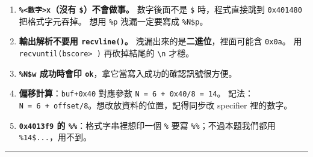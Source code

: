\documentclass[10pt,a4paper]{article}
\providecommand{\tightlist}{%
  \setlength{\itemsep}{0pt}\setlength{\parskip}{0pt}}
\begin{document}
\begin{enumerate}
  \begin{itemize}
  \tightlist
  \item
    \texttt{0x4060} 根本不在 \texttt{.\allowbreak{}bss}（\texttt{.\allowbreak{}bss} 是
    \texttt{0x404040}--\texttt{0x404070}），\texttt{0x404060} 是
    \textbf{stderr 的 COPY relocation 欄位}。
  \item
    這支程式\textbf{沒有匯入 \texttt{memcpy}}（\texttt{readelf\ \allowbreak{}-\allowbreak{}s} 只有
    write/strlen/strcspn/read/setvbuf）。
  \item
    \texttt{0x401540} 的 16 進位轉換只是把 18 bytes 寫進 printf
    自己堆疊框的暫存區，安全。 真正的原因在 §4.1 /
    §6：\texttt{overflow\_\allowbreak{}arg\_\allowbreak{}area} 初始化成 \texttt{buf}。
    \textbf{每個位址/機制都要自己用 \texttt{objdump}/\texttt{gdb}
    驗證，不要沿用別人的猜測。}
  \end{itemize}
\item
  \textbf{\texttt{\%\allowbreak{}\textless{}\allowbreak{}數字\textgreater{}\allowbreak{}x}（沒有
  \texttt{\$\allowbreak{}}）不會做事。} 數字後面不是 \texttt{\$\allowbreak{}} 時，程式直接跳到
  \texttt{0x401480} 把格式字元吞掉。 想用 \texttt{\%\allowbreak{}p} 洩漏一定要寫成
  \texttt{\%\allowbreak{}N\$\allowbreak{}p}。
\item
  \textbf{輸出解析不要用 \texttt{recvline()}。}
  洩漏出來的是\textbf{二進位}，裡面可能含 \texttt{0x0a}。 用
  \texttt{recvuntil(b\textquotesingle{}\allowbreak{}score\textgreater{}\allowbreak{}\ \allowbreak{}\textquotesingle{}\allowbreak{})}
  再砍掉結尾的 \texttt{\textbackslash{}\allowbreak{}n} 才穩。
\item
  \textbf{\texttt{\%\allowbreak{}N\$\allowbreak{}w} 成功時會印
  \texttt{ok}}，拿它當寫入成功的確認訊號很方便。
\item
  \textbf{偏移計算}：\texttt{buf+0x40} 對應參數
  \texttt{N\ \allowbreak{}=\ \allowbreak{}6\ \allowbreak{}+\ \allowbreak{}0x40/\allowbreak{}8\ \allowbreak{}=\ \allowbreak{}14}。
  記法：\texttt{N\ \allowbreak{}=\ \allowbreak{}6\ \allowbreak{}+\ \allowbreak{}offset/\allowbreak{}8}。想改放資料的位置，記得同步改
  specifier 裡的數字。
\item
  \textbf{\texttt{0x4013f9} 的 \texttt{\%\allowbreak{}\%\allowbreak{}}}：格式字串裡想印一個
  \texttt{\%\allowbreak{}} 要寫 \texttt{\%\allowbreak{}\%\allowbreak{}}；不過本題我們都用
  \texttt{\%\allowbreak{}14\$\allowbreak{}...}，用不到。
\end{enumerate}

\begin{center}\rule{0.5\linewidth}{0.5pt}\end{center}
\end{document}

